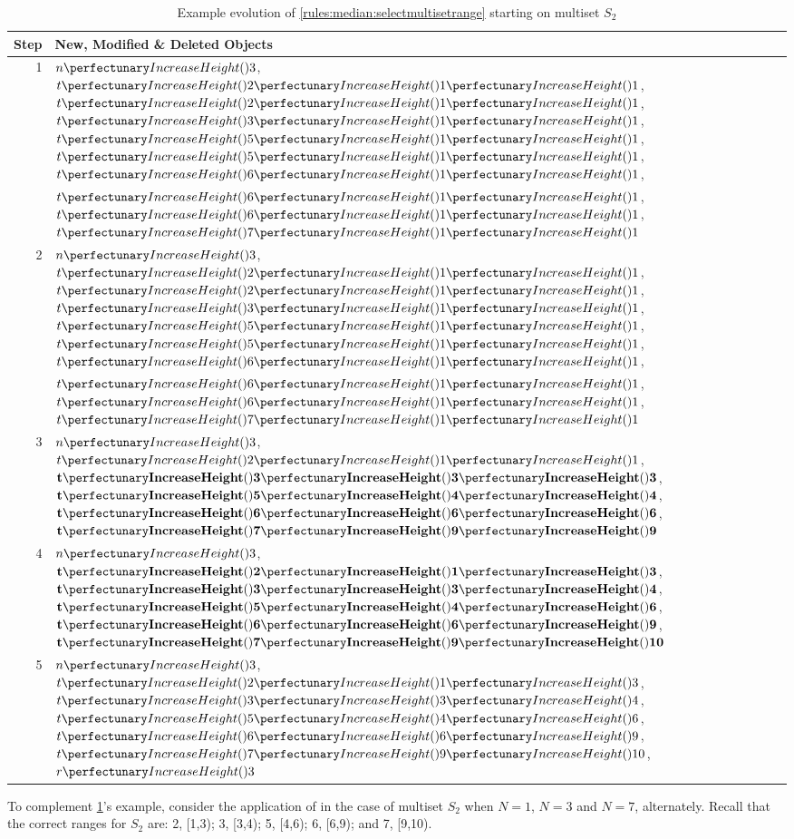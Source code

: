 \begin{table}[htbp]
\centering
   \begin{tabular}{|r|l|}
    \hline
    \textbf{Step} & \textbf{New, Modified \& Deleted Objects} \\ \hline
    1 & \(\cpfunc{n}{3}\), \(\cpfuncnn{t}{2}{1}{1}\), \(\cpfuncnn{t}{2}{1}{1}\), \(\cpfuncnn{t}{3}{1}{1}\), \(\cpfuncnn{t}{5}{1}{1}\), \(\cpfuncnn{t}{5}{1}{1}\), \(\cpfuncnn{t}{6}{1}{1}\),\\& \(\cpfuncnn{t}{6}{1}{1}\), \(\cpfuncnn{t}{6}{1}{1}\), \(\cpfuncnn{t}{7}{1}{1}\)\\ \hline
    
    2 & \(\cpfunc{n}{3}\), \(\cpfuncnn{t}{2}{1}{1}\), \sout{\(\cpfuncnn{t}{2}{1}{1}\)}, \(\cpfuncnn{t}{3}{1}{1}\), \(\cpfuncnn{t}{5}{1}{1}\), \sout{\(\cpfuncnn{t}{5}{1}{1}\)}, \(\cpfuncnn{t}{6}{1}{1}\),\\& \sout{\(\cpfuncnn{t}{6}{1}{1}\)}, \sout{\(\cpfuncnn{t}{6}{1}{1}\)}, \(\cpfuncnn{t}{7}{1}{1}\)\\ \hline
    
    3 & \(\cpfunc{n}{3}\), \(\cpfuncnn{t}{2}{1}{1}\), \(\mathbf{\cpfuncnn{t}{3}{3}{3}}\), \(\mathbf{\cpfuncnn{t}{5}{4}{4}}\), \(\mathbf{\cpfuncnn{t}{6}{6}{6}}\), \(\mathbf{\cpfuncnn{t}{7}{9}{9}}\)\\ \hline
    
    4 & \(\cpfunc{n}{3}\), \(\mathbf{\cpfuncnn{t}{2}{1}{3}}\), \(\mathbf{\cpfuncnn{t}{3}{3}{4}}\), \(\mathbf{\cpfuncnn{t}{5}{4}{6}}\), \(\mathbf{\cpfuncnn{t}{6}{6}{9}}\), \(\mathbf{\cpfuncnn{t}{7}{9}{10}}\)\\ \hline
    
    5 & \(\cpfunc{n}{3}\), \(\cpfuncnn{t}{2}{1}{3}\), \(\cpfuncnn{t}{3}{3}{4}\), \(\cpfuncnn{t}{5}{4}{6}\), \(\cpfuncnn{t}{6}{6}{9}\), \(\cpfuncnn{t}{7}{9}{10}\), \(\cpfunc{r}{3}\)\\ \hline
\end{tabular} 
\caption[Example evolution of \cref{rules:median:selectmultisetrange} to select the \(n^{\text{th}}\) element of an ordered multiset]{\label{tab:median:selectmultisetrange}Example evolution of \cref{rules:median:selectmultisetrange} starting on multiset \(S_2\)}
\end{table}

To complement \cref{tab:median:selectmultisetrange}'s example, consider the application of  in the case of multiset \(S_2\) when \(N = 1\), \(N = 3\) and \(N = 7\), alternately.  Recall that the correct ranges for \(S_2\) are:  2, [1,3); 3, [3,4); 5, [4,6); 6, [6,9); and 7, [9,10).


